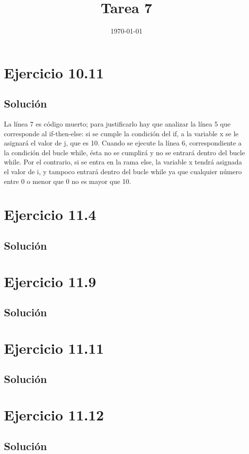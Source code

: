 \documentclass[11pt, a4paper, titlepage]{article}
\begin{document}
\title{Tarea 7}
\date{\today}
\maketitle
\newpage

\section*{Ejercicio 10.11}
\subsection*{Solución}

La línea 7 es código muerto; para justificarlo hay que analizar la línea 5 que
corresponde al if-then-else: si se cumple la condición del if, a la variable x
se le asignará el valor de j, que es 10. Cuando se ejecute la línea 6, correspondiente
a la condición del bucle while, ésta no se cumplirá y no se entrará dentro del bucle
while. Por el contrario, si se entra en la rama else, la variable x tendrá asignada
el valor de i, y tampoco entrará dentro del bucle while ya que cualquier número
entre 0 o menor que 0 no es mayor que 10.

\section{Ejercicio 11.4}
\subsection*{Solución}

\section{Ejercicio 11.9}
\subsection*{Solución}

\section{Ejercicio 11.11}
\subsection*{Solución}

\section{Ejercicio 11.12}
\subsection*{Solución}
\end{document}
